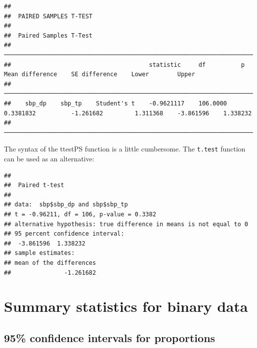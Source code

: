 \documentclass[
]{memoir}
\newenvironment{Shaded}{\begin{snugshade}}{\end{snugshade}}
\newcommand{\AttributeTok}[1]{\textcolor[rgb]{0.77,0.63,0.00}{#1}}
\newcommand{\ConstantTok}[1]{\textcolor[rgb]{0.00,0.00,0.00}{#1}}
\newcommand{\FunctionTok}[1]{\textcolor[rgb]{0.00,0.00,0.00}{#1}}
\newcommand{\NormalTok}[1]{#1}
\newcommand{\SpecialCharTok}[1]{\textcolor[rgb]{0.00,0.00,0.00}{#1}}
\begin{document}
\begin{verbatim}
## 
##  PAIRED SAMPLES T-TEST
## 
##  Paired Samples T-Test                                                                                                                   
##  ─────────────────────────────────────────────────────────────────────────────────────────────────────────────────────────────────────── 
##                                       statistic     df          p            Mean difference    SE difference    Lower        Upper      
##  ─────────────────────────────────────────────────────────────────────────────────────────────────────────────────────────────────────── 
##    sbp_dp    sbp_tp    Student's t    -0.9621117    106.0000    0.3381832          -1.261682         1.311368    -3.861596    1.338232   
##  ───────────────────────────────────────────────────────────────────────────────────────────────────────────────────────────────────────
\end{verbatim}

The syntax of the ttestPS function is a little cumbersome. The \texttt{t.test} function can be used as an alternative:

\begin{Shaded}
\end{Shaded}

\begin{verbatim}
## 
##  Paired t-test
## 
## data:  sbp$sbp_dp and sbp$sbp_tp
## t = -0.96211, df = 106, p-value = 0.3382
## alternative hypothesis: true difference in means is not equal to 0
## 95 percent confidence interval:
##  -3.861596  1.338232
## sample estimates:
## mean of the differences 
##               -1.261682
\end{verbatim}

\hypertarget{summary-statistics-for-binary-data}{%
\chapter{Summary statistics for binary data}\label{summary-statistics-for-binary-data}}

\hypertarget{confidence-intervals-for-proportions}{%
\section{95\% confidence intervals for proportions}\label{confidence-intervals-for-proportions}}
\end{document}
